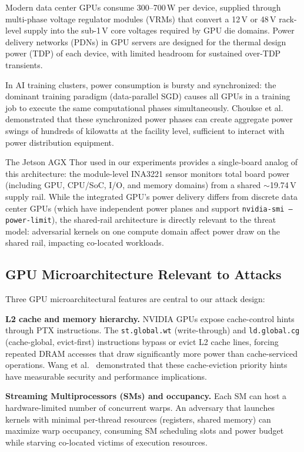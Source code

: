 \documentclass[letterpaper,twocolumn,10pt]{article}
\begin{document}
Modern data center GPUs consume 300--700\,W per device, supplied
through multi-phase voltage regulator modules (VRMs) that convert
a 12\,V or 48\,V rack-level supply into the sub-1\,V core voltages
required by GPU die domains.  Power delivery networks (PDNs) in GPU
servers are designed for the thermal design power (TDP) of each
device, with limited headroom for sustained over-TDP transients.

In AI training clusters, power consumption is bursty and
synchronized: the dominant training paradigm (data-parallel SGD)
causes all GPUs in a training job to execute the same computational
phases simultaneously.  Choukse et al.~\cite{choukse2025}
demonstrated that these synchronized power phases can create
aggregate power swings of hundreds of kilowatts at the facility
level, sufficient to interact with power distribution equipment.

The Jetson AGX Thor used in our experiments provides a
single-board analog of this architecture: the module-level INA3221
sensor monitors total board power (including GPU, CPU/SoC, I/O,
and memory domains) from a shared $\sim$19.74\,V supply rail.
While the integrated GPU's power delivery differs from discrete
data center GPUs (which have independent power planes and support
\texttt{nvidia-smi --power-limit}), the shared-rail architecture
is directly relevant to the threat model: adversarial kernels on
one compute domain affect power draw on the shared rail, impacting
co-located workloads.

\subsection{GPU Microarchitecture Relevant to Attacks}
\label{sec:bg-uarch}

Three GPU microarchitectural features are central to our attack
design:

\textbf{L2 cache and memory hierarchy.}
NVIDIA GPUs expose cache-control hints through PTX instructions.
The \texttt{st.global.wt} (write-through) and \texttt{ld.global.cg}
(cache-global, evict-first) instructions bypass or evict L2 cache
lines, forcing repeated DRAM accesses that draw significantly more
power than cache-serviced operations.  Wang et al.~\cite{wang2025}
demonstrated that these cache-eviction priority hints have
measurable security and performance implications.

\textbf{Streaming Multiprocessors (SMs) and occupancy.}
Each SM can host a hardware-limited number of concurrent warps.
An adversary that launches kernels with minimal per-thread resources
(registers, shared memory) can maximize warp occupancy, consuming
SM scheduling slots and power budget while starving co-located
victims of execution resources.
\end{document}
